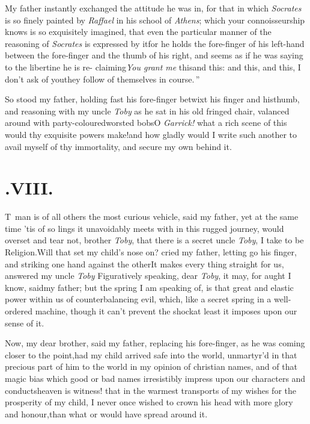 \documentclass{article}
\begin{document}
My father instantly exchanged the attitude he was in, for that
in which \textit{So\-crates} is so finely painted by \textit{Raffael} in
his school of \textit{Athens}; which your connoisseurship knows is so
exquisitely imagined, that even the particular manner of the
reasoning of \textit{Socrates} is expressed by it\tsk for he holds
the fore-finger of his left-hand between the fore-finger and the
thumb of his right, and seems as if he\pb 
was saying to the libertine he is re-\break
claiming\tsk \lqq\textit{You grant me} this\tsk and this:\break
\lqq and this, and this, I don’t ask of\break
\lqq you\tsk they follow of themselves in\break
\lqq course.\,”

So stood my father, holding fast his fore-finger betwixt his
finger and his\break thumb, and reasoning with my
uncle\break
\textit{Toby} as he sat in his old fringed chair, valanced
around with party-coloured\break worsted bobs\tsk O
\textit{Garrick!} what a rich scene of this would thy
exquisite powers make!\@ and how gladly would I write such
another to avail myself of thy immortality, and secure my
own behind it.

\newpage
\null\smallskip
\section{.\enspace VIII.}

\lettrine{T}{\,} man is of all others\break
the most curious vehicle, said my\break
father, yet at the same time ’tis of so 
\break 
lings it unavoidably meets with in this rugged journey,
would overset and tear  not, brother \textit{Toby}, that there is a secret
 uncle
\textit{Toby}, I take to be Religion.\tsk Will that set my
child’s nose on?  cried my father, letting go his finger,
and striking one hand against the other\tsk It makes every
thing straight for us, answered my uncle \textit{Toby}\tsk
Figuratively speaking, dear \textit{Toby}, it may, for aught
I know, said\pb my father; but the spring I am speaking of, is
that great and elastic power within us of counterbalancing
evil, which, like a secret spring in a well-ordered machine,
though it can’t prevent the shock\tsh at least it imposes
upon our sense of it.

Now, my dear brother, said my father, replacing his
fore-finger, as he was coming closer to the point,\tsk had my
child arrived safe into the world, unmartyr’d in that
precious part of him\tsk
{} 
to the world in my opinion of christian names, and of
that magic bias which good or bad names irresistibly impress
upon our characters and conducts\tsk heaven is witness! that
in the warmest transports of my wishes for the prosperity of
my child, I never once wished to crown his head with more
glory and honour,\pb than what  or
 would have spread around it.
\end{document}
